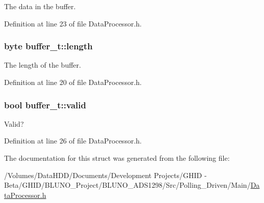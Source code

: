 \-The data in the buffer. 



\-Definition at line 23 of file \-Data\-Processor.\-h.

\hypertarget{structbuffer__t_a5f6ea3ee1957ac885233051495e45596}{
\subsubsection[{length}]{\setlength{\rightskip}{0pt plus 5cm}byte {\bf buffer\-\_\-t\-::length}}}\label{structbuffer__t_a5f6ea3ee1957ac885233051495e45596}


\-The length of the buffer. 



\-Definition at line 20 of file \-Data\-Processor.\-h.

\hypertarget{structbuffer__t_ab8c6d50976afb6e0717a0dc6e6bde41c}{
\subsubsection[{valid}]{\setlength{\rightskip}{0pt plus 5cm}bool {\bf buffer\-\_\-t\-::valid}}}\label{structbuffer__t_ab8c6d50976afb6e0717a0dc6e6bde41c}


\-Valid? 



\-Definition at line 26 of file \-Data\-Processor.\-h.



\-The documentation for this struct was generated from the following file\-:\begin{DoxyCompactItemize}
\item 
/\-Volumes/\-Data\-H\-D\-D/\-Documents/\-Development Projects/\-G\-H\-I\-D -\/ Beta/\-G\-H\-I\-D/\-B\-L\-U\-N\-O\-\_\-\-Project/\-B\-L\-U\-N\-O\-\_\-\-A\-D\-S1298/\-Src/\-Polling\-\_\-\-Driven/\-Main/\hyperlink{_data_processor_8h}{\-Data\-Processor.\-h}\end{DoxyCompactItemize}
